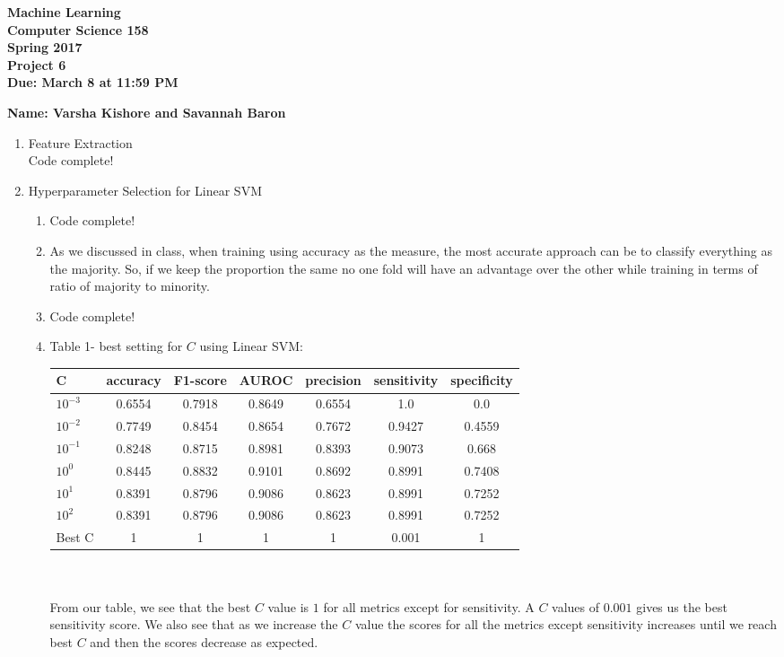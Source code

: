 \documentclass[11pt]{article}
\begin{document}
\newcommand{\Name}[1]{\noindent \textbf{Name:} #1 \\}
\newcommand{\pderiv}[2]{\frac{\partial #1}{\partial #2}}
\newcommand{\psderiv}[3]{\frac{\partial^2 #1}{\partial #2 \partial #3}}

\begin{center}
	\bf
	Machine Learning \\
	Computer Science 158 \\
	Spring 2017 \\
	\rm
	Project 6\\
	Due: March 8 at 11:59 PM \\
\end{center}
\noindent \textbf{Name: Varsha Kishore and Savannah Baron} \\
\begin{enumerate}
\item Feature Extraction \\
Code complete!
\item Hyperparameter Selection for Linear SVM
\begin{enumerate}
\item Code complete!
\item As we discussed in class, when training using accuracy as the measure, 
the most accurate approach can be to classify everything as the majority. So, if we 
keep the proportion the same no one fold will have an advantage over the other while
training in terms of ratio of majority to minority. 
\item Code complete!
\item Table 1- best setting for $C$ using Linear SVM:\\
\begin{tabular}{| l | c | c | c | c | c | c |}
  \hline		
  C & accuracy & F1-score & AUROC & precision & sensitivity & specificity \\
  \hline
  $10^{-3}$ & 0.6554 & 0.7918 & 0.8649 & 0.6554 & 1.0 & 0.0 \\
  $10^{-2}$ & 0.7749 & 0.8454 & 0.8654 & 0.7672 & 0.9427 & 0.4559  \\
  $10^{-1}$ &  0.8248 & 0.8715 & 0.8981 & 0.8393 & 0.9073 & 0.668 \\
  $10^{0}$ &  0.8445 & 0.8832 & 0.9101 & 0.8692 & 0.8991 & 0.7408 \\
  $10^{1}$ &  0.8391 & 0.8796 & 0.9086 & 0.8623 & 0.8991 & 0.7252 \\
  $10^{2}$ &  0.8391 & 0.8796 & 0.9086 & 0.8623 & 0.8991 & 0.7252 \\
  \hline
  Best C & 1 & 1 & 1 & 1 & 0.001 & 1 \\
  \hline  
\end{tabular}\\ \\
From our table, we see that the best $C$ value is $1$ for all metrics except for sensitivity. A $C$ values of $0.001$ gives us the best sensitivity score. We also see that as we increase the $C$ value the scores for all the metrics except sensitivity increases until we reach best $C$ and then the scores decrease as expected. 


\end{enumerate}
\end{enumerate}
\end{document}
